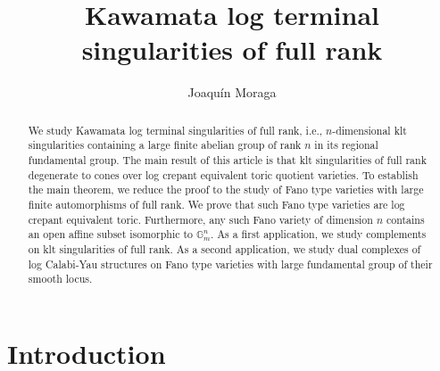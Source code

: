 \documentclass{amsart}
\theoremstyle{remark}
\numberwithin{equation}{section}
\begin{document}
\title[Kawamata log terminal singularities of full rank]{Kawamata log terminal singularities of full rank}

\author[J.~Moraga]{Joaqu\'in Moraga}
\address{Department of Mathematics, Princeton University, Fine Hall, Washington Road, Princeton, NJ 08544-1000, USA
}

\maketitle

\begin{abstract}
We study Kawamata log terminal singularities of full rank, i.e., 
$n$-dimensional klt singularities containing a large finite abelian group of rank $n$ in its regional fundamental group.
The main result of this article 
is that klt singularities of full rank degenerate to cones over log crepant equivalent
toric quotient varieties.
To establish the main theorem, we reduce the proof to the study of Fano type varieties with large finite automorphisms of full rank.
We prove that such Fano type varieties are log crepant equivalent  toric. 
Furthermore, any such Fano variety of dimension $n$ contains an open affine subset isomorphic to $\mathbb{G}_m^n$.
As a first application,
we study complements on klt singularities of full rank.
As a second application, we study dual complexes of log Calabi-Yau structures on
Fano type varieties with large fundamental group of their smooth locus.
\end{abstract}

\setcounter{tocdepth}{1} 
\tableofcontents

\section{Introduction}
\end{document}
